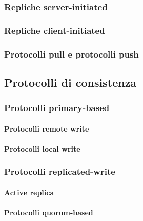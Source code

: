 \subsubsection{Repliche server-initiated}
\subsubsection{Repliche client-initiated}
\subsubsection{Protocolli pull e protocolli push}
\subsection{Protocolli di consistenza}
\subsubsection{Protocolli primary-based}
\paragraph{Protocolli remote write}
\paragraph{Protocolli local write}
\subsubsection{Protocolli replicated-write}
\paragraph{Active replica}
\paragraph{Protocolli quorum-based}
